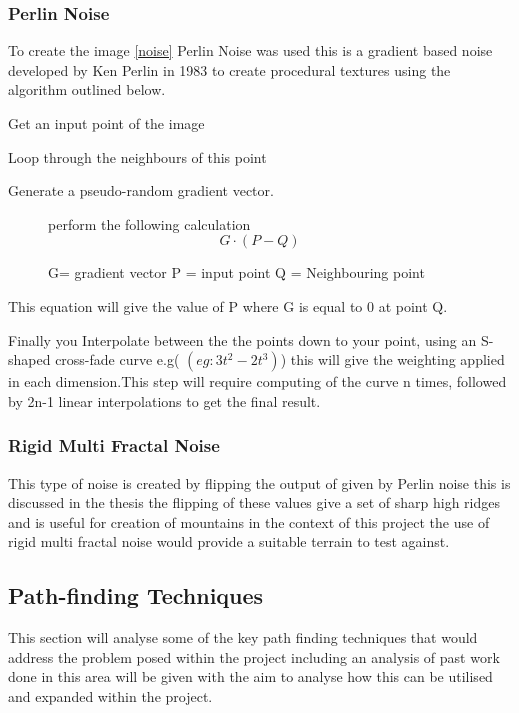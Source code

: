 \subsubsection{Perlin Noise}
\label{Perlin}
To create the image \ref{noise} Perlin Noise was used this is a gradient based noise developed by Ken Perlin in 1983 \cite{perlin} to create procedural textures using the algorithm outlined below. 
\begin{itemize}
\item Get an input point of the image 
\item Loop through the neighbours of this point
\item Generate a pseudo-random gradient vector.
\begin{figure}[h]
\centering
\item perform the following calculation
\begin{equation}
\label{eq:Noise}
G \cdot(P-Q)
\end{equation}
\caption{G= gradient vector P = input point Q = Neighbouring point}
\label{noise:eq}
\end{figure}

This equation will give the value of P where G is equal to 0 at point Q.
\item Finally you Interpolate between the the points down to your point, using an S-shaped cross-fade curve e.g( 
\begin{math}(eg: 3t^2-2t^3)\end{math}) this will give the weighting applied in each dimension.This step will require computing of the curve n times, followed by 2n-1 linear interpolations to get the final result.
\end{itemize}

\subsubsection{Rigid Multi Fractal Noise}
This type of noise is created by flipping the output of given by Perlin noise this is discussed in the thesis \cite{RMF} the flipping of these values give a set of sharp high ridges and is useful for creation of mountains in the context of this project the use of rigid multi fractal noise would provide a suitable terrain to test against.     
\subsection{Path-finding Techniques}
This section will analyse some of the key path finding techniques that would address the problem posed within the project including an analysis of past work done in this area will be given with the aim to analyse how this can be utilised and expanded within the project. 
